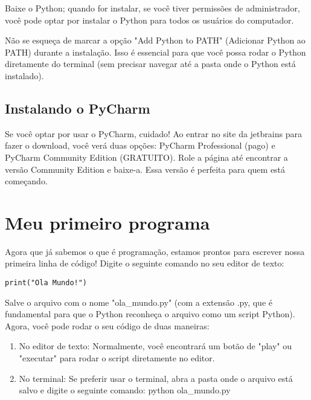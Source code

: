 \documentclass[12pt]{book}
\begin{document}
	Baixe o Python; quando for instalar, se você tiver permissões de administrador, você pode optar por instalar o Python para todos os usuários do computador.
	
	\begin{tcolorbox}[colback=gray!10, colframe=black, title={\large\bfseries Importante}]
	Não se esqueça de marcar a opção "Add Python to PATH" (Adicionar Python ao PATH) durante a instalação. Isso é essencial para que você possa rodar o Python diretamente do terminal (sem precisar navegar até a pasta onde o Python está instalado).
	\end{tcolorbox}
	\subsection{Instalando o PyCharm}
	
	Se você optar por usar o PyCharm, cuidado! Ao entrar no site da jetbrains para fazer o download, você verá duas opções: PyCharm Professional (pago) e PyCharm Community Edition (GRATUITO). Role a página até encontrar a versão Community Edition e baixe-a. Essa versão é perfeita para quem está começando.
	
	\section{Meu primeiro programa}
	
	Agora que já sabemos o que é programação, estamos prontos para escrever nossa primeira linha de código! Digite o seguinte comando no seu editor de texto:
	
	\begin{lstlisting}[caption={Olá mundo em python}] 
print("Ola Mundo!")\end{lstlisting}
	
	
	Salve o arquivo com o nome "ola\_mundo.py" (com a extensão .py, que é fundamental para que o Python reconheça o arquivo como um script Python). Agora, você pode rodar o seu código de duas maneiras:
	
	\begin{enumerate}
		\item No editor de texto: Normalmente, você encontrará um botão de "play" ou "executar" para rodar o script diretamente no editor.
		
		\item No terminal: Se preferir usar o terminal, abra a pasta onde o arquivo está salvo e digite o seguinte comando: python ola\_mundo.py	
	\end{enumerate}
	
\end{document}
